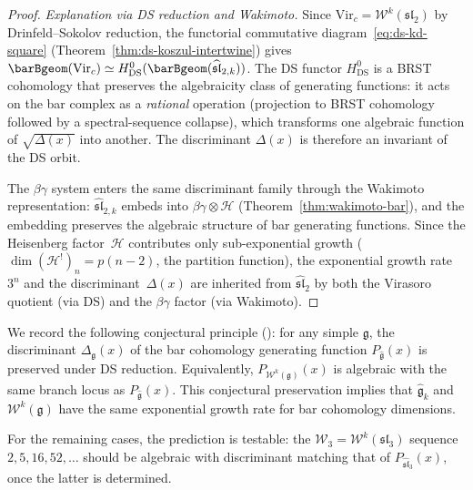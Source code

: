 \begin{proof}
\emph{Explanation via DS reduction and Wakimoto.}
Since $\mathrm{Vir}_c = \mathcal{W}^k(\mathfrak{sl}_2)$ by
Drinfeld--Sokolov reduction, the functorial commutative
diagram~\eqref{eq:ds-kd-square}
(Theorem~\ref{thm:ds-koszul-intertwine}) gives
$\barBgeom(\mathrm{Vir}_c) \simeq
H^0_{\mathrm{DS}}(\barBgeom(\widehat{\mathfrak{sl}}_{2,k}))$.
The DS functor $H^0_{\mathrm{DS}}$ is a BRST cohomology that preserves
the algebraicity class of generating functions:
it acts on the bar complex as a \emph{rational} operation
(projection to BRST cohomology followed by a spectral-sequence
collapse), which transforms one algebraic function of
$\sqrt{\Delta(x)}$ into another.  The discriminant $\Delta(x)$
is therefore an invariant of the DS orbit.

The $\beta\gamma$ system enters the same discriminant family
through the Wakimoto representation:
$\widehat{\mathfrak{sl}}_{2,k}$ embeds into
$\beta\gamma \otimes \mathcal{H}$ (Theorem~\ref{thm:wakimoto-bar}),
and the embedding preserves the algebraic structure of bar
generating functions.  Since the Heisenberg factor~$\mathcal{H}$
contributes only sub-exponential growth
($\dim (\mathcal{H}^!)_n = p(n{-}2)$, the partition function),
the exponential growth rate~$3^n$ and the discriminant~$\Delta(x)$
are inherited from $\widehat{\mathfrak{sl}}_2$ by both the
Virasoro quotient (via DS) and the $\beta\gamma$ factor (via Wakimoto).
\end{proof}

\begin{remark}\label{rem:ds-discriminant-invariant}
We record the following conjectural principle
(\ClaimStatusConjectured): for any simple $\mathfrak{g}$, the
discriminant $\Delta_{\mathfrak{g}}(x)$ of the bar cohomology
generating function $P_{\widehat{\mathfrak{g}}}(x)$ is preserved under
DS reduction.  Equivalently, $P_{\mathcal{W}^k(\mathfrak{g})}(x)$ is
algebraic with the same branch locus as
$P_{\widehat{\mathfrak{g}}}(x)$.  This conjectural preservation implies
that $\widehat{\mathfrak{g}}_k$ and $\mathcal{W}^k(\mathfrak{g})$
have the same exponential
growth rate for bar cohomology dimensions.

For the remaining cases, the prediction is testable:
the $\mathcal{W}_3 = \mathcal{W}^k(\mathfrak{sl}_3)$ sequence
$2, 5, 16, 52, \ldots$ should be algebraic with discriminant
matching that of $P_{\widehat{\mathfrak{sl}}_3}(x)$, once the latter
is determined.
\end{remark}

